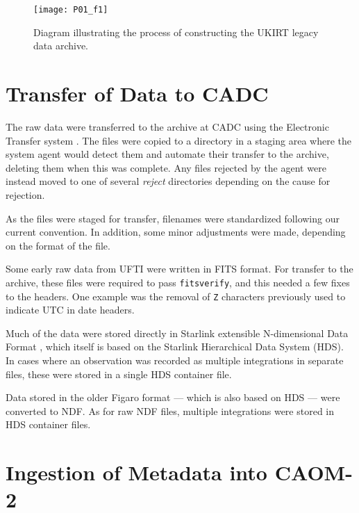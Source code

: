 \documentclass[11pt,twoside]{article}
\begin{document}
\begin{figure}[ht]
\texttt{[image: P01\_f1]}
\caption{Diagram illustrating
the process of constructing the UKIRT legacy data archive.}
\label{p01:fig:flowchart}
\end{figure}

\section{Transfer of Data to CADC}
\label{p01:sec:etransfer}

The raw data were transferred to the archive at CADC
using the
Electronic Transfer system \citep{2005ASPC..347..647M}.
The files were copied to a directory in a
staging area where the system agent would
detect them and automate their transfer to the
archive, deleting them when this was complete.
Any files rejected by the agent were instead moved
to one of several \textit{reject} directories depending
on the cause for rejection.

As the files were staged for transfer,
filenames were standardized following our current convention.
In addition,
some minor adjustments were made,
depending on the format of the file.


Some early raw data from UFTI were written in FITS format.
For transfer to the archive, these files were
required to pass
\texttt{fitsverify},
and this needed a few fixes to the headers.
One example was the removal of \texttt{Z} characters
previously used to indicate UTC in date headers.


Much of the data were stored directly in
Starlink extensible N-dimensional Data Format
\citep[see for example,][]{P91_adassxxiii},
which itself is based on the
Starlink Hierarchical Data System (HDS).
In cases where an observation was recorded as
multiple integrations in separate files,
these were stored in a single HDS container file.


Data stored in the older Figaro format \citep{1993ASPC...52..219S}
--- which is also based on HDS ---
were converted to NDF.
As for raw NDF files, multiple integrations
were stored in HDS container files.

\section{Ingestion of Metadata into CAOM-2}
\end{document}
